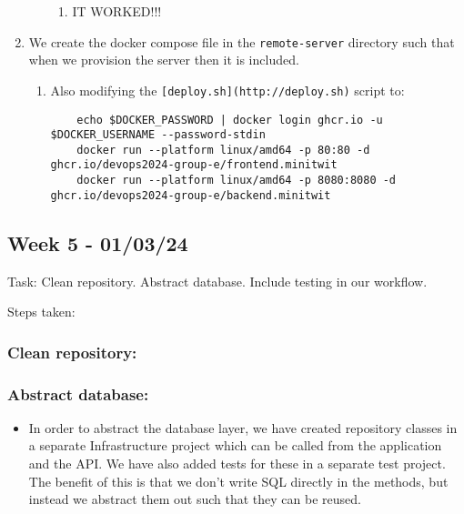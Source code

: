 \begin{enumerate}
\begin{enumerate}
        \begin{enumerate}
            \item IT WORKED!!!
        \end{enumerate}
    \end{enumerate}
    \item We create the docker compose file in the \texttt{remote-server} directory such that when we provision the server then it is included.

    \begin{enumerate}
        \item Also modifying the \texttt{{[}deploy.sh{]}(http://deploy.sh)} script to:

\begin{verbatim}
    echo $DOCKER_PASSWORD | docker login ghcr.io -u $DOCKER_USERNAME --password-stdin
    docker run --platform linux/amd64 -p 80:80 -d ghcr.io/devops2024-group-e/frontend.minitwit
    docker run --platform linux/amd64 -p 8080:8080 -d ghcr.io/devops2024-group-e/backend.minitwit
\end{verbatim}
    \end{enumerate}
\end{enumerate}

\subsection{Week 5 - 01/03/24}
\label{log:week5}

Task: Clean repository. Abstract database. Include testing in our
workflow.

Steps taken:

\subsubsection{Clean repository:}
\label{log:clean-repository}

\subsubsection{Abstract database:}
\label{log:abstract-database}

\begin{itemize}
    \item In order to abstract the database layer, we have created repository classes in a separate Infrastructure project which can be called from the application and the API. We have also added tests for these in a separate test project. The benefit of this is that we don't write SQL directly in the methods, but instead we abstract them out such that they can be reused.
\end{itemize}

